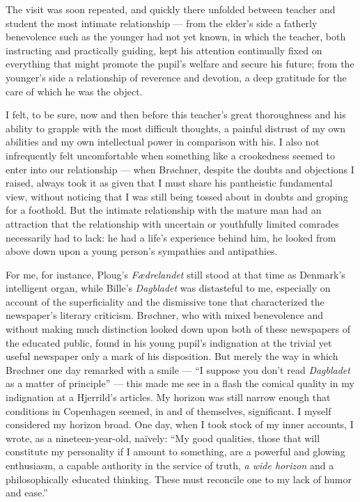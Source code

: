 \documentclass[12pt,a4paper]{article}
\newcommand{\pnum}[1]{\noindent\makebox[0pt][r]{\small\textit{[#1]}\quad}}
\begin{document}
The visit was soon repeated, and quickly there unfolded between teacher
and student the most intimate relationship --- from the elder's side a
fatherly benevolence such as the younger had not yet known, in which
the teacher, both instructing and practically guiding, kept his
attention continually fixed on everything that might promote the
pupil's welfare and secure his future; from the younger's side a
relationship of reverence and devotion, a deep gratitude for the care
of which he was the object.

I felt, to be sure, now and then before this teacher's great
\pnum{131}thoroughness and his ability to grapple with the most
difficult thoughts, a painful distrust of my own abilities and my own
intellectual power in comparison with his. I also not infrequently
felt uncomfortable when something like a crookedness seemed to enter
into our relationship --- when Brøchner, despite the doubts and
objections I raised, always took it as given that I must share his
pantheistic fundamental view, without noticing that I was still being
tossed about in doubts and groping for a foothold. But the intimate
relationship with the mature man had an attraction that the relationship
with uncertain or youthfully limited comrades necessarily had to lack:
he had a life's experience behind him, he looked from above down upon a
young person's sympathies and antipathies.

For me, for instance, Ploug's \textit{Fædrelandet} still stood at
that time as Denmark's intelligent organ, while Bille's
\textit{Dagbladet} was distasteful to me, especially on account of the
superficiality and the dismissive tone that characterized the
newspaper's literary criticism. Brøchner, who with mixed benevolence
and without making much distinction looked down upon both of these
newspapers of the educated public, found in his young pupil's
indignation at the trivial yet useful newspaper only a mark of his
disposition. But merely the way in which Brøchner one day remarked with
a smile --- ``I suppose you don't read \textit{Dagbladet} as a matter
of principle'' --- this made me see in a flash the comical quality in
my indignation at a Hjerrild's articles. My horizon was still narrow
enough that conditions in Copenhagen seemed, in and of themselves,
significant. I myself considered my horizon broad. One day, when I took
stock of my inner accounts, I wrote, as a nineteen-year-old, naïvely:
``My good qualities, those that will constitute my personality if I
amount to something, are a powerful and glowing enthusiasm, a capable
authority in the service of truth, \textit{a wide \pnum{132}horizon} and a
philosophically educated thinking. These must reconcile one to my lack
of humor and ease.''
\end{document}
